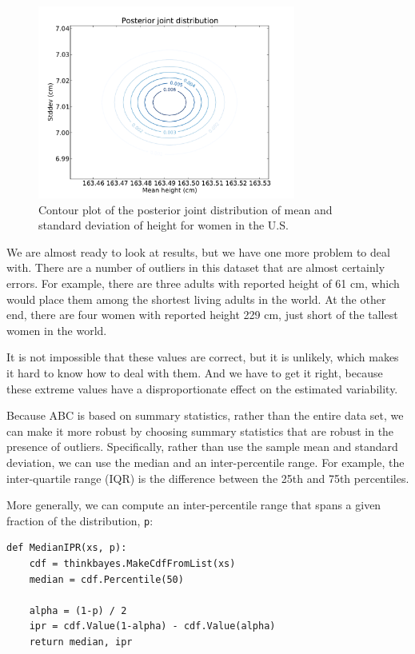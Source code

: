 \documentclass[12pt]{book}
\begin{document}
\begin{figure}
\centerline{\includegraphics[height=2.5in]{figs/variability_posterior_female.pdf}}
\caption{Contour plot of the posterior joint distribution of
mean and standard deviation of height for women in the U.S.}
\label{fig.variability2}
\end{figure}

We are almost ready to look at results, but we have one more
problem to deal with.  There are a number of outliers in this
dataset that are almost certainly errors.  For example, there
are three adults with reported height of 61 cm, which would
place them among the shortest living adults in the world.
At the other end, there are four women with reported height
229 cm, just short of the tallest women in the world.

It is not impossible that these values are correct, but it is
unlikely, which makes it hard to know how to deal with them.
And we have to get
it right, because these extreme values have a disproportionate
effect on the estimated variability.

Because ABC is based on summary statistics, rather than the entire
data set, we can make it more robust by choosing summary statistics
that are robust in the presence of outliers.  Specifically, rather
than use the sample mean and standard deviation, we can use the median
and an inter-percentile range.  For example, the inter-quartile range
(IQR) is the difference between the 25th and 75th percentiles.

More generally, we can compute an inter-percentile range that
spans a given fraction of the distribution, {\tt p}:

\begin{verbatim}
def MedianIPR(xs, p):
    cdf = thinkbayes.MakeCdfFromList(xs)
    median = cdf.Percentile(50)

    alpha = (1-p) / 2
    ipr = cdf.Value(1-alpha) - cdf.Value(alpha)
    return median, ipr
\end{verbatim}
\end{document}
